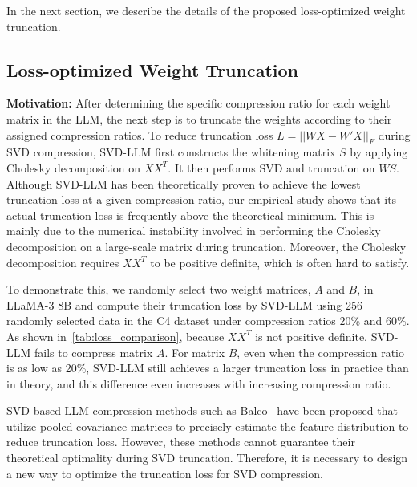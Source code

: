 %
In the next section, we describe the details of the proposed loss-optimized weight truncation.  
%



\subsection{Loss-optimized Weight Truncation}
\label{subsec:loss_optimized_weight_truncation}
%
\noindent \textbf{Motivation:} 
After determining the specific compression ratio for each weight matrix in the LLM, the next step is to truncate the weights according to their assigned compression ratios. 
%
To reduce truncation loss $L= ||WX-W'X||_F$ during SVD compression, SVD-LLM first constructs the whitening matrix $S$ by applying Cholesky decomposition on $XX^T$. It then performs SVD and truncation on $WS$. Although SVD-LLM has been theoretically proven to achieve the lowest truncation loss at a given compression ratio, our empirical study shows that its actual truncation loss is frequently above the theoretical minimum. This is mainly due to the numerical instability involved in performing the Cholesky decomposition on a large-scale matrix during truncation. Moreover, the Cholesky decomposition requires $XX^T$ to be positive definite, which is often hard to satisfy.

%
To demonstrate this, we randomly select two weight matrices, $A$ and $B$, in LLaMA-3 8B and compute their truncation loss by SVD-LLM using 256 randomly selected data in the C4 dataset under compression ratios 20\% and 60\%. As shown in~\cref{tab:loss_comparison}, because $XX^T$ is not positive definite, SVD-LLM fails to compress matrix $A$. For matrix $B$, even when the compression ratio is as low as 20\%, SVD-LLM still achieves a larger truncation loss in practice than in theory, and this difference even increases with increasing compression ratio. 

SVD-based LLM compression methods such as Balco~\citep{DBLP:journals/corr/abs-2405-10616} have been proposed that utilize pooled covariance matrices to precisely estimate the feature distribution to reduce truncation loss. However, these methods cannot guarantee their theoretical optimality during SVD truncation. 
%
Therefore, it is necessary to design a new way to optimize the truncation loss for SVD compression. 

